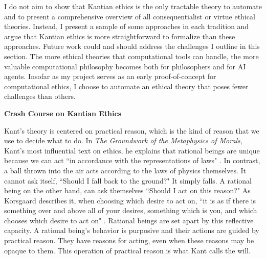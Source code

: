 \begin{isabellebody}
\begin{isamarkuptext}
I do not aim to show that Kantian ethics is the only tractable theory to automate and
to present a comprehensive overview of all consequentialist or virtue ethical theories. Instead, I 
present a sample of some approaches in each tradition and argue that Kantian ethics is more straightforward 
to formalize than these approaches. Future work could and should address the challenges I outline in 
this section. The more ethical theories that computational tools can handle, the more valuable 
computational philosophy becomes both for philosophers and for AI agents. Insofar as my project serves 
as an early proof-of-concept for computational ethics, I choose to automate an ethical theory that 
poses fewer challenges than others.%
\end{isamarkuptext}\isamarkuptrue%
%
\isadelimdocument
%
\endisadelimdocument
%
\isatagdocument
%
\isamarkuptrue%
%
\endisatagdocument
{\isafolddocument}%
%
\isadelimdocument
%
\endisadelimdocument
%
\begin{isamarkuptext}%
\textbf{Crash Course on Kantian Ethics}%
\end{isamarkuptext}\isamarkuptrue%
%
\begin{isamarkuptext}%
Kant's theory is centered on practical reason, which is the kind of reason that we 
use to decide what to do. In \emph{The Groundwork of the Metaphysics of Morals}, Kant's most influential 
text on ethics, he explains that rational beings are unique because we can act ``in accordance with 
the representations of laws" \cite[4:412]{groundwork}. In contrast, a ball thrown into the air acts 
according to the laws of physics themselves. It cannot ask itself, ``Should I fall back to the ground?" 
It simply falls. A rational being on the other hand, can ask themselves ``Should I act on this reason?" 
As Korsgaard describes it, when choosing which desire to act on, ``it is as if there is something over 
and above all of your desires, something which is you, and which chooses which desire to act on" \cite[100]{sources}. 
Rational beings are set apart by this reflective capacity. A rational being's behavior is purposive and 
their actions are guided by practical reason. They have reasons for acting, even when these reasons may be 
opaque to them. This operation of practical reason is what Kant calls the will. 


\end{isamarkuptext}
\end{isabellebody}
